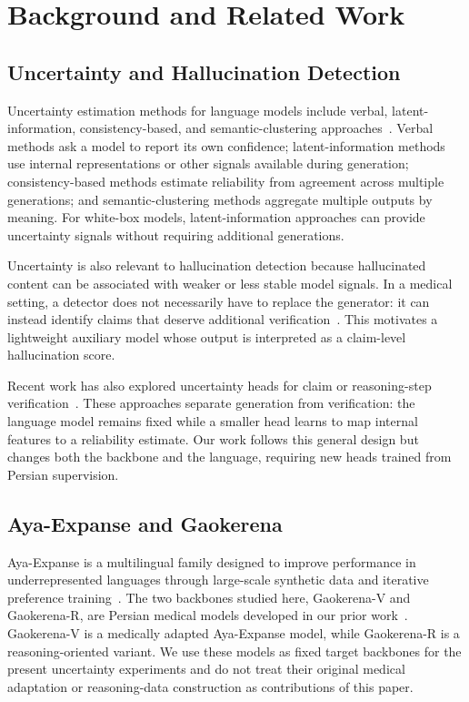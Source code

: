 \documentclass[conference]{IEEEtran}
\begin{document}
\section{Background and Related Work}

\subsection{Uncertainty and Hallucination Detection}

Uncertainty estimation methods for language models include verbal, latent-information, consistency-based, and semantic-clustering approaches~\cite{b4}. Verbal methods ask a model to report its own confidence; latent-information methods use internal representations or other signals available during generation; consistency-based methods estimate reliability from agreement across multiple generations; and semantic-clustering methods aggregate multiple outputs by meaning. For white-box models, latent-information approaches can provide uncertainty signals without requiring additional generations.

Uncertainty is also relevant to hallucination detection because hallucinated content can be associated with weaker or less stable model signals. In a medical setting, a detector does not necessarily have to replace the generator: it can instead identify claims that deserve additional verification~\cite{b5,b6}. This motivates a lightweight auxiliary model whose output is interpreted as a claim-level hallucination score.

Recent work has also explored uncertainty heads for claim or reasoning-step verification~\cite{b7}. These approaches separate generation from verification: the language model remains fixed while a smaller head learns to map internal features to a reliability estimate. Our work follows this general design but changes both the backbone and the language, requiring new heads trained from Persian supervision.

\subsection{Aya-Expanse and Gaokerena}

Aya-Expanse is a multilingual family designed to improve performance in underrepresented languages through large-scale synthetic data and iterative preference training~\cite{b8,b9,b10}. The two backbones studied here, Gaokerena-V and Gaokerena-R, are Persian medical models developed in our prior work~\cite{b2,b3}. Gaokerena-V is a medically adapted Aya-Expanse model, while Gaokerena-R is a reasoning-oriented variant. We use these models as fixed target backbones for the present uncertainty experiments and do not treat their original medical adaptation or reasoning-data construction as contributions of this paper.
\end{document}
